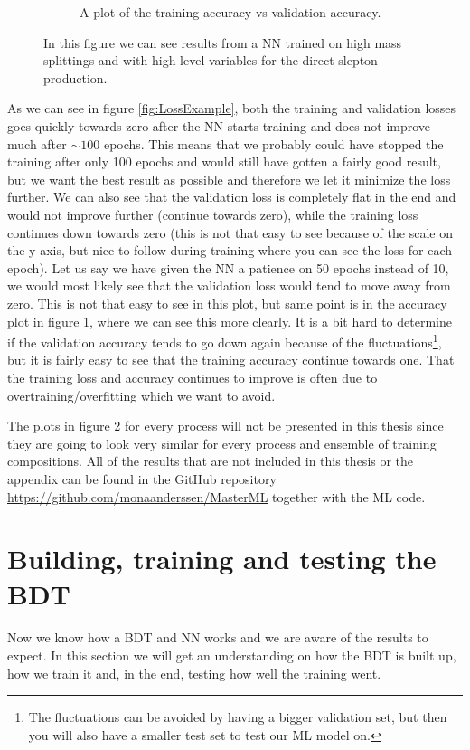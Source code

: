 \begin{figure}[H]
\begin{subfigure}[t!]{0.49\textwidth}
        \caption{A plot of the training accuracy vs validation accuracy.}
        \label{fig:AccExample}
    \end{subfigure}
    \caption{In this figure we can see results from a NN trained on high mass splittings and with high level variables for the direct slepton production.}
    \label{fig:resLossAccExample}
\end{figure}

As we can see in figure \ref{fig:LossExample}, both the training and validation losses goes quickly towards zero after the NN starts training and does not improve much after $\sim 100$ epochs. This means that we probably could have stopped the training after only 100 epochs and would still have gotten a fairly good result, but we want the best result as possible and therefore we let it minimize the loss further. We can also see that the validation loss is completely flat in the end and would not improve further (continue towards zero), while the training loss continues down towards zero (this is not that easy to see because of the scale on the y-axis, but nice to follow during training where you can see the loss for each epoch). Let us say we have given the NN a patience on 50 epochs instead of 10, we would most likely see that the validation loss would tend to move away from zero. This is not that easy to see in this plot, but same point is in the accuracy plot in figure \ref{fig:AccExample}, where we can see this more clearly. It is a bit hard to determine if the validation accuracy tends to go down again because of the fluctuations\footnote{The fluctuations can be avoided by having a bigger validation set, but then you will also have a smaller test set to test our ML model on.}, but it is fairly easy to see that the training accuracy continue towards one. That the training loss and accuracy continues to improve is often due to overtraining/overfitting which we want to avoid.

The plots in figure \ref{fig:resLossAccExample} for every process will not be presented in this thesis since they are going to look very similar for every process and ensemble of training compositions. All of the results that are not included in this thesis or the appendix can be found in the GitHub repository \url{https://github.com/monaanderssen/MasterML} together with the ML code.


\section{Building, training and testing the BDT}
Now we know how a BDT and NN works and we are aware of the results to expect. In this section we will get an understanding on how the BDT is built up, how we train it and, in the end, testing how well the training went.


